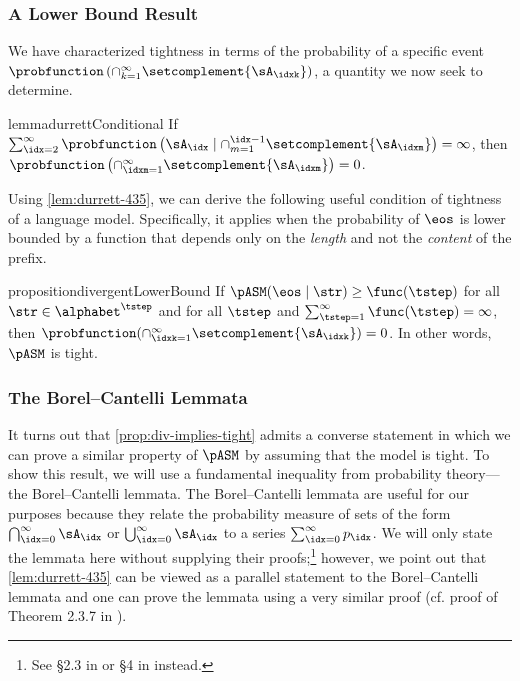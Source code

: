\subsubsection{A Lower Bound Result}
We have characterized tightness in terms of the probability of a specific event $\probfunction\left(\cap_{k=1}^{\infty} \setcomplement{\sA_\idxk}\right)$, a quantity we now seek to determine.
\begin{restatable}{lemma}{durrettConditional} \label{lem:durrett-435}
If $\sum_{\idx=2}^\infty \probfunction\left(\sA_\idx\mid \cap_{m=1}^{\idx-1}\setcomplement{\sA_\idxm}\right)=\infty$, then
$\probfunction\left(\cap_{\idxm=1}^\infty \setcomplement{\sA_\idxm}\right)=0$.
\end{restatable}

Using \cref{lem:durrett-435}, we can derive the following useful condition of tightness of a language model. Specifically, it applies when the probability of $\eos$ is lower bounded by a function that depends only on the \emph{length} and not the \emph{content} of the prefix.
\begin{restatable}{proposition}{divergentLowerBound} \label{prop:div-implies-tight}
    If $\pASM(\eos\mid\str)\geq \func(\tstep)$ for all $\str\in\alphabet^\tstep$ and for all $\tstep$ and $\sum_{\tstep=1}^\infty \func(\tstep)=\infty$, then $\probfunction(\cap_{\idxk=1}^\infty \setcomplement{\sA_\idxk})=0$. In other words, $\pASM$ is tight.
\end{restatable}

\subsubsection{The Borel--Cantelli Lemmata}
It turns out that \cref{prop:div-implies-tight} admits a converse statement in which we can prove a similar property of $\pASM$ by assuming that the model is tight.
To show this result, we will use a fundamental inequality from probability theory---the Borel--Cantelli lemmata. 
The Borel--Cantelli lemmata are useful for our purposes because they relate the probability measure of sets of the form $\bigcap_{\idx=0}^\infty \sA_\idx$ or $\bigcup_{\idx=0}^\infty \sA_\idx$ to a series $\sum_{\idx=0}^\infty p_\idx$.
We will only state the lemmata here without supplying their proofs;\footnote{See \S2.3 in \citet{Durrett2019} or \S4 in \citet{Billingsley1986} instead.} however, we point out that \cref{lem:durrett-435} can be viewed as a parallel statement to the Borel--Cantelli lemmata and one can prove the lemmata using a very similar proof (cf. proof of Theorem 2.3.7 in \citealp{Durrett2019}).

